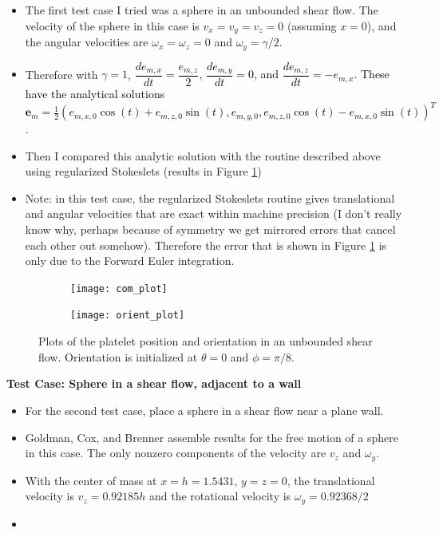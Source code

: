 \documentclass{article}
\newcommand{\vect}[1]{\boldsymbol{\mathbf{#1}}}
\begin{document}
{\color{gray}
\begin{itemize}
\item The first test case I tried was a sphere in an unbounded shear
  flow. The velocity of the sphere in this case is $v_x = v_y = v_z =
  0$ (assuming $x = 0$), and the angular velocities are $\omega_x =
  \omega_z = 0$ and $\omega_y = \gamma/2$.
\item Therefore with $\gamma = 1$,
  \textcolor{black}{$\dfrac{de_{m,x}}{dt} = \dfrac{e_{m, z}}{2}$,
    $\dfrac{de_{m, y}}{dt} = 0$, and $\dfrac{de_{m,z}}{dt} =
    -e_{m,x}$. These have the analytical solutions $\vect{e}_m =
    \frac{1}{2} (e_{m,x,0} \cos(t) + e_{m,z,0} \sin(t), e_{m,y,0},
    e_{m,z,0} \cos(t) - e_{m,x,0}\sin(t))^T$.}
\item Then I compared this analytic solution with the routine
  described above using regularized Stokeslets (results in Figure
  \ref{fig:com_plot})
\item Note: in this test case, the regularized Stokeslets routine
  gives translational and angular velocities that are exact within
  machine precision (I don't really know why, perhaps because of
  symmetry we get mirrored errors that cancel each other out
  somehow). Therefore the error that is shown in Figure
  \ref{fig:com_plot} is only due to the Forward Euler integration. 
\end{itemize}
}

\begin{figure}
  \centering
  \begin{subfigure}{0.49\textwidth}
    \texttt{[image: com\_plot]}    
  \end{subfigure}
  \hfill
  \begin{subfigure}{0.49\textwidth}
    \texttt{[image: orient\_plot]}
  \end{subfigure}
  \caption{Plots of the platelet position and orientation in an
    unbounded shear flow. Orientation is initialized at $\theta = 0$
    and $\phi = \pi/8$.}
  \label{fig:com_plot}
\end{figure}

\newpage

\textbf{Test Case: Sphere in a shear flow, adjacent to a wall}

{\color{gray}
\begin{itemize}
\item For the second test case, place a sphere in a shear flow near a
  plane wall.
\item Goldman, Cox, and Brenner \cite{Goldman1967b} assemble results
  for the free motion of a sphere in this case. The only nonzero
  components of the velocity are $v_z$ and $\omega_y$.
\item With the center of mass at $x = h = 1.5431$, $y = z = 0$, the
  translational velocity is $v_z = 0.92185 h$ and the rotational
  velocity is $\omega_y = 0.92368 / 2$
\item 
\end{itemize}
}
\end{document}
